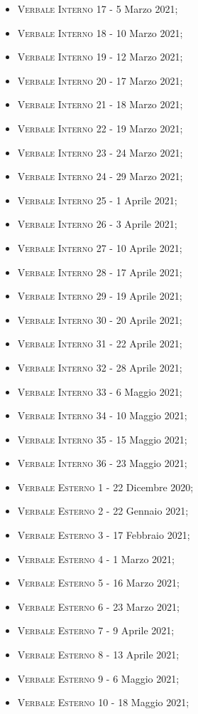 \documentclass[10pt,stdletter,dateno,sigright]{newlfm}  %
\begin{document}
\begin{newlfm}
\begin{multicols}{2}
\begin{itemize}
            \item \textsc{Verbale Interno 17} - 5 Marzo 2021;
            \item \textsc{Verbale Interno 18} - 10 Marzo 2021;
            \item \textsc{Verbale Interno 19} - 12 Marzo 2021;
            \item \textsc{Verbale Interno 20} - 17 Marzo 2021;
            \item \textsc{Verbale Interno 21} - 18 Marzo 2021;
            \item \textsc{Verbale Interno 22} - 19 Marzo 2021;
            \item \textsc{Verbale Interno 23} - 24 Marzo 2021;
            \item \textsc{Verbale Interno 24} - 29 Marzo 2021;
            \item \textsc{Verbale Interno 25} - 1 Aprile 2021;
            \item \textsc{Verbale Interno 26} - 3 Aprile 2021;
            \item \textsc{Verbale Interno 27} - 10 Aprile 2021;
            \item \textsc{Verbale Interno 28} - 17 Aprile 2021;
            \item \textsc{Verbale Interno 29} - 19 Aprile 2021;
            \item \textsc{Verbale Interno 30} - 20 Aprile 2021;
            \item \textsc{Verbale Interno 31} - 22 Aprile 2021;
                \item \textsc{Verbale Interno 32} - 28 Aprile 2021;
                \item \textsc{Verbale Interno 33} - 6 Maggio 2021;
                \item \textsc{Verbale Interno 34} - 10 Maggio 2021;
                \item \textsc{Verbale Interno 35} - 15 Maggio 2021;
               \item \textsc{Verbale Interno 36} - 23 Maggio 2021;
               \item \textsc{Verbale Esterno 1} - 22 Dicembre 2020;
               \item \textsc{Verbale Esterno 2} - 22 Gennaio 2021;
            \item \textsc{Verbale Esterno 3} - 17 Febbraio 2021;
            \item \textsc{Verbale Esterno 4} - 1 Marzo 2021;
            \item \textsc{Verbale Esterno 5} - 16 Marzo 2021;
            \item \textsc{Verbale Esterno 6} - 23 Marzo 2021;
            \item \textsc{Verbale Esterno 7} - 9 Aprile 2021;
            \item \textsc{Verbale Esterno 8} - 13 Aprile 2021;
            \item \textsc{Verbale Esterno 9} - 6 Maggio 2021;
                \item \textsc{Verbale Esterno 10} - 18 Maggio 2021;
            \end{itemize}
        \end{multicols}
 

\end{newlfm}
\end{document}
